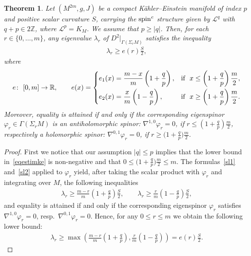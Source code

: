 \documentclass[pdftex]{sigma}
\numberwithin{equation}{section}
\newtheorem{thm}{Theorem}[section]
\theoremstyle{definition}
\begin{document}
\begin{thm}\label{estimke}
Let $(M^{2m}, g, J)$ be a compact K\"ahler--Einstein manifold of index $p$ and positive scalar curvature $S$, carrying the ${\mathop{\rm spin}^c}$ structure given by $\mathcal{L}^q$ with $q+p\in 2\mathbb{Z}$, where $\mathcal{L}^p=K_M$. We assume that  $p\geq |q|$.
Then, for each $r\in\{0, \dots, m\}$, any eigenvalue $\lambda_r$ of $D^2|_{\Gamma(\Sigma_r M )}$ satisfies the inequality
\begin{gather}\label{eqestimke}
 \lambda_r\geq e(r)\frac{S}{2},
 \end{gather}
where
\begin{gather*}
e\colon \ [0,m]\to\mathbb{R}, \qquad  e(x)=\begin{cases}
   \displaystyle    e_1(x)=\frac{m-x}{m}\left(1+\frac{q}{p}\right), & \displaystyle\text{if} \ \ x\leq \left(1+\frac{q}{p}\right)\frac{m}{2},
   \vspace{1mm}\\
    \displaystyle    e_2(x)=\frac{x}{m}\left(1-\frac{q}{p}\right),  & \displaystyle\text{if} \ \ x\geq \left(1+\frac{q}{p}\right)\frac{m}{2}.                                                                                                                        \end{cases}
\end{gather*}
Moreover, equality is attained if and only if the corresponding eigenspinor $\varphi_r\in\Gamma(\Sigma_r M)$ is an antiholomorphic spinor: $\nabla^{1,0}\varphi_r=0$, if $r\leq \left(1+\frac{q}{p}\right)\frac{m}{2}$, respectively a holomorphic spinor: $\nabla^{0,1}\varphi_r=0$, if $r \geq \big(1+\frac{q}{p}\big)\frac{m}{2}$.
\end{thm}


\begin{proof}
First we notice that our assumption $|q|\leq p$ implies that the lower bound in~\eqref{eqestimke} is non-negative and that $0\leq \big(1+\frac{q}{p}\big)\frac{m}{2}\leq m$. The formulas~\eqref{sl1} and~\eqref{sl2} applied to $\varphi_r$ yield, after taking the scalar product with $\varphi_r$ and integrating over $M$, the following inequalities
 \begin{gather*}\lambda_r\geq \frac{m-r}{m}\left(1+\frac{q}{p}\right)\frac{S}{2},\qquad
 \lambda_r\geq \frac{r}{m}\left(1-\frac{q}{p}\right)\frac{S}{2},\end{gather*}
and equality is attained if and only if the corresponding eigenspinor $\varphi_r$ satisf\/ies $\nabla^{1,0}\varphi_r=0$, resp.~$\nabla^{0,1}\varphi_r=0$. Hence, for any $0\leq r\leq m$ we obtain the following lower bound:
\begin{gather*}
\lambda_r\geq \max\left(\frac{m-r}{m}\left(1+\frac{q}{p}\right),\frac{r}{m}\left(1-\frac{q}{p}\right)\right)=  e(r)\frac{S}{2}.\tag*{\qed}
\end{gather*}
\renewcommand{\qed}{}
\end{proof}
\end{document}

